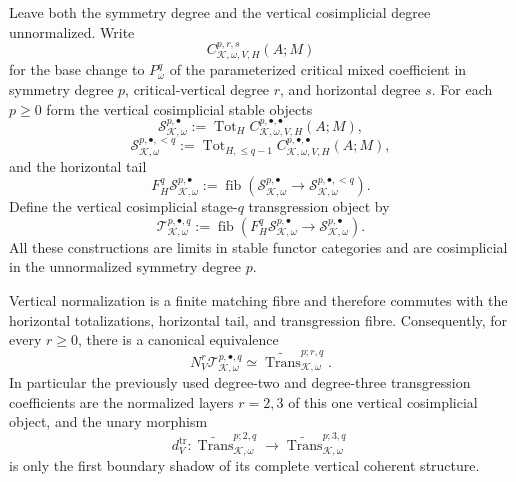 \begin{construction}
\label{constr:symmetry-noether-cosimplicial-closed-presymplectic-transgression-object}
Leave both the symmetry degree and the vertical cosimplicial degree unnormalized.
Write
\[
C_{\mathcal K,\omega,V,H}^{p,r,s}(A;M)
\]
for the base change to $P_\omega^q$ of the parameterized critical mixed coefficient
in symmetry degree $p$, critical-vertical degree $r$, and horizontal degree $s$.
For each $p\ge0$ form the vertical cosimplicial stable objects
\[
\mathscr S_{\mathcal K,\omega}^{p,\bullet}
:=
\operatorname{Tot}_H
C_{\mathcal K,\omega,V,H}^{p,\bullet,\bullet}(A;M),
\]
\[
\mathscr S_{\mathcal K,\omega}^{p,\bullet,<q}
:=
\operatorname{Tot}_{H,\le q-1}
C_{\mathcal K,\omega,V,H}^{p,\bullet,\bullet}(A;M),
\]
and the horizontal tail
\[
F_H^q\mathscr S_{\mathcal K,\omega}^{p,\bullet}
:=
\operatorname{fib}
\left(
\mathscr S_{\mathcal K,\omega}^{p,\bullet}
\longrightarrow
\mathscr S_{\mathcal K,\omega}^{p,\bullet,<q}
\right).
\]
Define the vertical cosimplicial stage-$q$ transgression object by
\[
\boxed{
\mathscr T_{\mathcal K,\omega}^{p,\bullet,q}
:=
\operatorname{fib}
\left(
F_H^q\mathscr S_{\mathcal K,\omega}^{p,\bullet}
\longrightarrow
\mathscr S_{\mathcal K,\omega}^{p,\bullet}
\right).
}
\]
All these constructions are limits in stable functor categories and are
cosimplicial in the unnormalized symmetry degree $p$.

Vertical normalization is a finite matching fibre and therefore commutes with the
horizontal totalizations, horizontal tail, and transgression fibre.  Consequently,
for every $r\ge0$, there is a canonical equivalence
\[
\boxed{
N_V^r
\mathscr T_{\mathcal K,\omega}^{p,\bullet,q}
\simeq
\widetilde{\operatorname{Trans}}_{\mathcal K,\omega}^{p;r,q}.
}
\]
In particular the previously used degree-two and degree-three transgression
coefficients are the normalized layers $r=2,3$ of this one vertical cosimplicial
object, and the unary morphism
\[
d_V^{\mathrm{tr}}:
\widetilde{\operatorname{Trans}}_{\mathcal K,\omega}^{p;2,q}
\longrightarrow
\widetilde{\operatorname{Trans}}_{\mathcal K,\omega}^{p;3,q}
\]
is only the first boundary shadow of its complete vertical coherent structure.


\end{construction}
